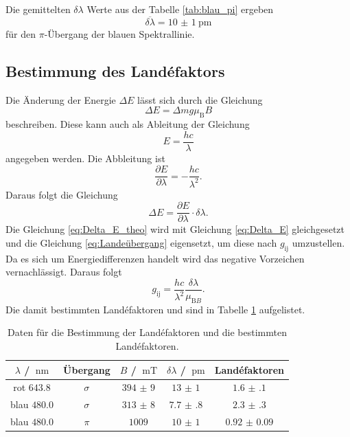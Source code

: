 \FloatBarrier
Die gemittelten $\delta \lambda$ Werte aus der Tabelle \ref{tab:blau_pi} ergeben 
\begin{equation*}
    \overline{\delta\lambda} = \SI{10(1)}{\pico\meter}
\end{equation*}
für den $\pi$-Übergang der blauen Spektrallinie.
\subsection{Bestimmung des Landéfaktors}
Die Änderung der Energie $\Delta E$ lässt sich durch die Gleichung 
\begin{equation}
    \label{eq:Delta_E_theo}
    \Delta E = \Delta mg\mu_{\text{B}}B
\end{equation}
beschreiben. 
Diese kann auch als Ableitung der Gleichung
\begin{equation*}
    E = \frac{hc}{\lambda}
\end{equation*}
angegeben werden. 
Die Abbleitung ist 
\begin{equation*}
    \frac{\partial E}{\partial \lambda}=-\frac{hc}{\lambda^2}.
\end{equation*}
Daraus folgt die Gleichung 
\begin{equation}
    \label{eq:Delta_E}
    \Delta E =\frac{\partial E}{\partial \lambda}\cdot \delta\lambda.
\end{equation}
Die Gleichung \eqref{eq:Delta_E_theo} wird mit Gleichung \eqref{eq:Delta_E} gleichgesetzt und die Gleichung \eqref{eq:Landeübergang} eigensetzt, um diese nach $g_{\text{ij}}$ umzustellen. Da es sich um 
Energiedifferenzen handelt wird das negative Vorzeichen vernachlässigt.
Daraus folgt
\begin{equation}
    \label{eq:g_Bestimmung}
    g_{\text{ij}}=\frac{hc}{\lambda^2}\frac{\delta \lambda}{\mu_{\text{B}B}}.
\end{equation}
Die damit bestimmten Landéfaktoren und sind in Tabelle \ref{tab:exp_lande} aufgelistet.
\FloatBarrier
\begin{table}
    \centering
    \caption{Daten für die Bestimmung der Landéfaktoren und die bestimmten Landéfaktoren.}
    \label{tab:exp_lande}
    \begin{tabular}{c c c c c}
        \toprule
        $\lambda$ / $\SI{}{\nano\meter}$&Übergang&$B$ / $\SI{}{\milli\tesla}$&$\delta \lambda$ / $\SI{}{\pico\meter}$&Landéfaktoren\\
        \midrule
        rot $\num{643.8}$ &$\sigma$ &$\num{394(9)}$ &$\num{13(1)}$  &$\num{1.6(1)}$\\
        blau $\num{480.0}$&$\sigma$ &$\num{313(8)}$ &$\num{7.7(8)}$ &$\num{2.3(3)}$\\
        blau $\num{480.0}$&$\pi$    &$\num{1009}$   &$\num{10(1)}$  &$\num{0.92(9)}$\\
        \bottomrule
    \end{tabular}
\end{table}




